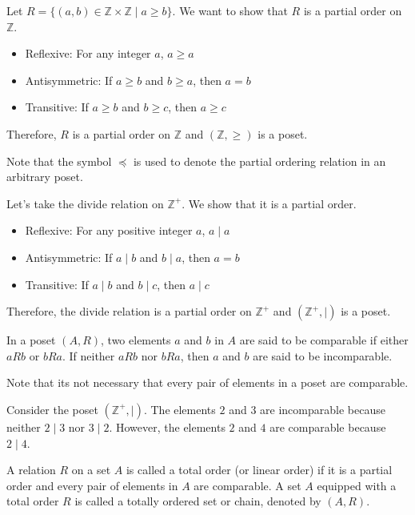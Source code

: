 \begin{eg}
    Let $R = \{(a,b) \in \mathbb{Z} \times \mathbb{Z} \mid a \geq b\}$. We want to show that $R$ is a partial order on $\mathbb{Z}$.
    \begin{itemize}[itemsep=1pt,label=$\circ$]
        \item Reflexive: For any integer $a$, $a \geq a$
        \item Antisymmetric: If $a \geq b$ and $b \geq a$, then $a = b$
        \item Transitive: If $a \geq b$ and $b \geq c$, then $a \geq c$
    \end{itemize}
    Therefore, $R$ is a partial order on $\mathbb{Z}$ and $(\mathbb{Z}, \geq)$ is a poset.
\end{eg}
Note that the symbol $\preceq$ is used to denote the partial ordering relation in an arbitrary poset.

\begin{eg}
    Let's take the divide relation on $\mathbb{Z}^+$. We show that it is a partial order.
    \begin{itemize}[itemsep=1pt,label=$\circ$]
        \item Reflexive: For any positive integer $a$, $a \mid a$
        \item Antisymmetric: If $a \mid b$ and $b \mid a$, then $a = b$
        \item Transitive: If $a \mid b$ and $b \mid c$, then $a \mid c$
    \end{itemize}
    Therefore, the divide relation is a partial order on $\mathbb{Z}^+$ and $(\mathbb{Z}^+, \mid)$ is a poset.
\end{eg}

\begin{definition}
    In a poset $(A, R)$, two elements $a$ and $b$ in $A$ are said to be comparable if either $a R b$ or $b R a$. If neither $a R b$ nor $b R a$, then $a$ and $b$ are said to be incomparable.
\end{definition}
Note that its not necessary that every pair of elements in a poset are comparable.

\begin{eg}
    Consider the poset $(\mathbb{Z}^+, \mid)$. The elements $2$ and $3$ are incomparable because neither $2 \mid 3$ nor $3 \mid 2$. However, the elements $2$ and $4$ are comparable because $2 \mid 4$.
\end{eg}

\begin{definition}
    A relation $R$ on a set $A$ is called a total order (or linear order) if it is a partial order and every pair of elements in $A$ are comparable. A set $A$ equipped with a total order $R$ is called a totally ordered set or chain, denoted by $(A, R)$.
\end{definition}

